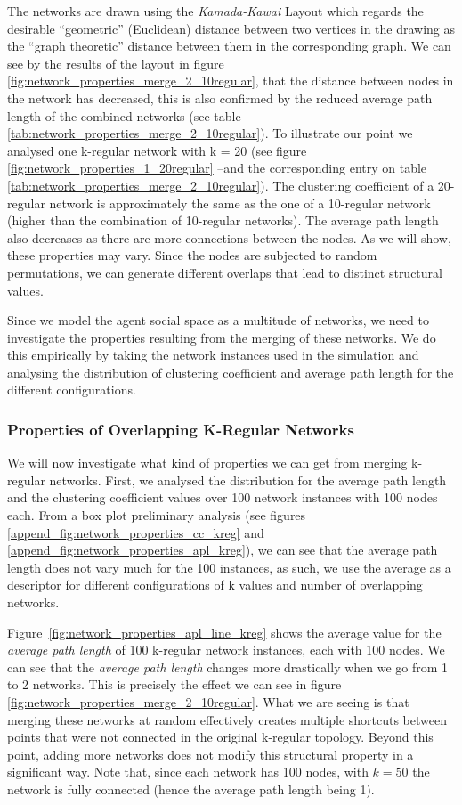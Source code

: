 \documentclass[preprint,number]{elsarticle}
\begin{document}
The networks are drawn using the \textit{Kamada-Kawai} Layout \cite{Kamada19897} which regards the desirable ``geometric'' (Euclidean) distance between two vertices in the drawing as the ``graph theoretic'' distance between them in the corresponding graph. We can see by the results of the layout in figure \ref{fig:network_properties_merge_2_10regular}, that the distance between nodes in the network has decreased, this is also confirmed by the reduced average path length of the combined networks (see table \ref{tab:network_properties_merge_2_10regular}). To illustrate our point we analysed one k-regular network with k = 20 (see figure \ref{fig:network_properties_1_20regular} --and the corresponding entry on table \ref{tab:network_properties_merge_2_10regular}). The clustering coefficient of a 20-regular network is approximately the same as the one of a 10-regular network (higher than the combination of 10-regular networks). The average path length also decreases as there are more connections between the nodes. As we will show, these properties may vary. Since the nodes are subjected to random permutations, we can generate different overlaps that lead to distinct structural values.

Since we model the agent social space as a multitude of networks, we need to investigate the properties resulting from the merging of these networks. We do this empirically by taking the network instances used in the simulation and analysing the distribution of clustering coefficient and average path length for the different configurations.

\subsubsection{Properties of Overlapping K-Regular Networks}
\label{sec:overlapping_kreg}
We will now investigate what kind of properties we can get from merging k-regular networks. First, we analysed the distribution for the average path length and the clustering coefficient values over 100 network instances with 100 nodes each. From a box plot preliminary analysis (see figures \ref{append_fig:network_properties_cc_kreg} and \ref{append_fig:network_properties_apl_kreg}), we can see that the average path length does not vary much for the 100 instances, as such, we use the average as a descriptor for different configurations of k values and number of overlapping networks. 

Figure~\ref{fig:network_properties_apl_line_kreg} shows the average value for the \textit{average path length} of 100 k-regular network instances, each with 100 nodes. We can see that the \textit{average path length} changes more drastically when we go from 1 to 2 networks. This is precisely the effect we can see in figure \ref{fig:network_properties_merge_2_10regular}. What we are seeing is that merging these networks at random effectively creates multiple shortcuts between points that were not connected in the original k-regular topology. Beyond this point, adding more networks does not modify this structural property in a significant way. Note that, since each network has 100 nodes, with $k=50$ the network is fully connected (hence the average path length being 1). 
\end{document}
